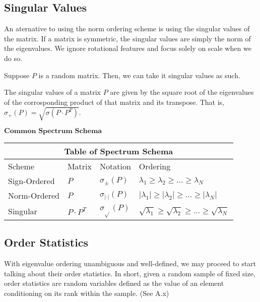 
\subsection{Singular Values}

An aternative to using the norm ordering scheme is using the singular values of the matrix. If a matrix is symmetric, the singular values are simply the norm of the eigenvalues. We ignore rotational features and focus solely on scale when we do so.

Suppose $P$ is a random matrix. Then, we can take it singular values as such.

\begin{definition}
The singular values of a matrix $P$ are given by the square root of the eigenvalues of the corrosponding product of that matrix and its transpose. That is, $\sigma_+(P) = \sqrt{\sigma(P \cdot P^T)}$.
\end{definition}

\newpage

\begin{center}
$\textbf{Common Spectrum Schema}$
\end{center}

\begin{tabular}{ |p{3cm}|p{2cm}|p{3cm}|p{5cm}|  }
 \hline
 \multicolumn{4}{|c|}{Table of Spectrum Schema} \\
 \hline
 Scheme & Matrix & Notation & Ordering \\
 \hline
 Sign-Ordered & $P$ & $\sigma_{\pm}(P)$ & $\lambda_1 \geq \lambda_2 \geq ... \geq \lambda_N$ \\
 Norm-Ordered & $P$ & $\sigma_{|\cdot|}(P)$ & $|\lambda_1| \geq |\lambda_2| \geq ... \geq |\lambda_N|$ \\
 Singular & $P \cdot P^T$ & $\sigma_{\sqrt{}}(P)$ & $\sqrt{\lambda_1} \geq \sqrt{\lambda_2} \geq ... \geq \sqrt{\lambda_N}$ \\
 \hline
\end{tabular}


\subsection{Order Statistics}

With eigenvalue ordering unambiguous and well-defined, we may proceed to start talking about their order statistics. In short, given a random sample of fixed size, order statistics are random variables defined as the value of an element conditioning on its rank within the sample. (See A.x)



